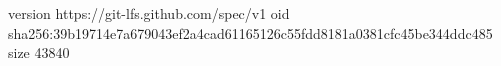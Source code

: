 version https://git-lfs.github.com/spec/v1
oid sha256:39b19714e7a679043ef2a4cad61165126c55fdd8181a0381cfc45be344ddc485
size 43840

